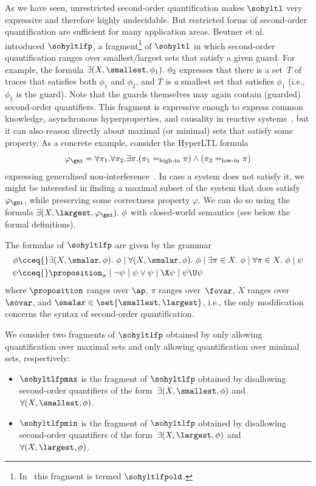 As we have seen, unrestricted second-order quantification makes $\sohyltl$ very expressive and therefore highly undecidable. 
But restricted forms of second-order quantification are sufficient for many application areas.
Beutner et al.~\cite{DBLP:conf/cav/BeutnerFFM23} introduced $\sohyltlfp$,
a fragment\footnote{In~\cite{DBLP:conf/cav/BeutnerFFM23} this fragment is termed $\sohyltlfpold$.}  of $\sohyltl$ in which second-order quantification ranges over smallest/largest sets that satisfy a given guard. For example, the formula $\exists (X,\smallest, \phi_1).\ \phi_2$ expresses that there is a set~$T$ of traces that satisfies both $\phi_1$ and $\phi_2$, and $T$ is \emph{a} smallest set that satisfies $\phi_1$ (i.e., $\phi_1$ is the guard). 
Note that the guards themselves may again contain (guarded) second-order quantifiers.
This fragment is expressive enough to express common knowledge, asynchronous hyperproperties, and causality in reactive systems~\cite{DBLP:conf/cav/BeutnerFFM23}, but it can also reason directly about maximal (or minimal) sets that satisfy some property. 
As a concrete example, consider the HyperLTL formula 
\[\varphi_{\gni} = \forall \pi_1. \forall \pi_2. \exists \pi. (\pi_1 =_{\text{high-in}} \pi) \wedge (\pi_2 =_{\text{low-in}} \pi) \] expressing generalized non-interference~\cite{ClarksonFKMRS14}. In case a system does not satisfy it, we might be interested in finding a maximal subset of the system that does satisfy $\varphi_{\gni}$, while preserving some correctness property $\varphi$. We can do so using the formula $\exists (X,\largest, \varphi_{\gni}).\ \phi$  with closed-world semantics (see below the formal definitions). 


The formulas of $\sohyltlfp$ are given by the grammar
\begin{align*}
\phi  {}& \cceq {} \exists (X,\smalar,\phi).\ \phi \mid \forall (X,\smalar,\phi).\ \phi \mid \exists \pi \in X.\ \phi \mid \forall \pi \in X.\ \phi \mid \psi\\
\psi {}&  \cceq {} \proposition_\pi \mid \neg \psi \mid \psi \vee \psi \mid \X \psi \mid \psi \U \psi    
\end{align*}
where $\proposition$ ranges over $\ap$, $\pi$ ranges over~$\fovar$, $X$ ranges over $\sovar$, and $\smalar \in \set{\smallest, \largest}$, i.e., the only modification concerns the syntax of second-order quantification. 

We consider two fragments of $\sohyltlfp$ obtained by only allowing quantification over maximal sets and only allowing quantification over minimal sets, respectively:
\begin{itemize}
    \item $\sohyltlfpmax$ is the fragment of $\sohyltlfp$ obtained by disallowing second-order quantifiers of the form~$\exists (X,\smallest,\phi) $ and $ \forall (X,\smallest,\phi)$.
    \item $\sohyltlfpmin$ is the fragment of $\sohyltlfp$ obtained by disallowing second-order quantifiers of the form~$\exists (X,\largest,\phi) $ and $ \forall (X,\largest,\phi)$.
\end{itemize}

